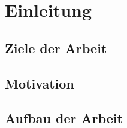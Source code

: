 \chapter{Einleitung}
\section{Ziele der Arbeit} \label{sec:einlZiel}

\section{Motivation} \label{sec:einlMotivation}

\section{Aufbau der Arbeit} \label{sec:einlAufbau}
